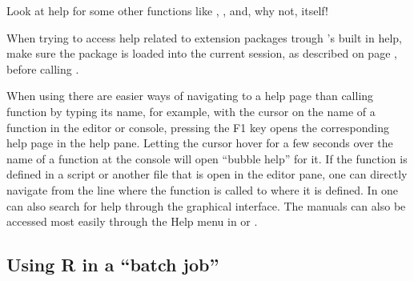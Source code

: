 \documentclass[krantz2]{krantz}\usepackage{knitr}
\begin{document}
\begin{knitrout}\footnotesize
{}\color{fgcolor}\begin{kframe}
\begin{alltt}
\hlstd{(}\hlstd{)}
\end{alltt}
\end{kframe}
\end{knitrout}

\begin{playground}
Look at help for some other functions like , ,  and, why not,  itself!

\begin{knitrout}\footnotesize
{}\color{fgcolor}\begin{kframe}
\begin{alltt}
\end{alltt}
\end{kframe}
\end{knitrout}
\end{playground}

\begin{warningbox}
When trying to access help related to \Rlang extension packages trough \Rlang's built in help, make sure the package is loaded into the current \Rlang session, as described on page \pageref{sec:packages:install}, before calling .
\end{warningbox}

When using \RStudio there are easier ways of navigating to a help page than calling function  by typing its name, for example, with the cursor on the name of a function in the editor or console, pressing the \textsf{F1} key opens the corresponding help page in the help pane. Letting the cursor hover for a few seconds over the name of a function at the \Rpgrm console will open ``bubble help'' for it. If the function is defined in a script or another file that is open in the editor pane, one can directly navigate from the line where the function is called to where it is defined. In \RStudio one can also search for help through the graphical interface. The \Rlang manuals can also be accessed most easily through the Help menu in \RStudio or .

\subsection{Using R in a ``batch job''}
\end{document}

